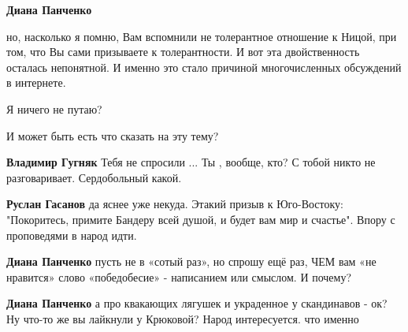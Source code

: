 \begin{itemize}
\begin{itemize}
\textbf{Диана Панченко} 

но, насколько я помню, Вам вспомнили не толерантное отношение к Ницой, при том,
что Вы сами призываете к толерантности. И вот эта двойственность осталась
непонятной. И именно это стало причиной многочисленных обсуждений в интернете.

Я ничего не путаю?

И может быть есть что сказать на эту тему?

 
\textbf{Владимир Гугняк} Тебя не спросили ... Ты , вообще, кто? С тобой никто не разговаривает. Сердобольный какой.

 
\textbf{Руслан Гасанов} да яснее уже некуда. Этакий призыв к Юго-Востоку: "Покоритесь, примите Бандеру всей душой, и будет вам мир и счастье". Впору с проповедями в народ идти.

 
\textbf{Диана Панченко} пусть не в «сотый раз», но спрошу ещё раз, ЧЕМ вам «не нравится» слово «победобесие» - написанием или смыслом. И почему?

 
\textbf{Диана Панченко} а про квакающих лягушек и украденное у скандинавов - ок? Ну что-то же вы лайкнули у Крюковой? Народ интересуется. что именно

 

\end{itemize}
\end{itemize}
